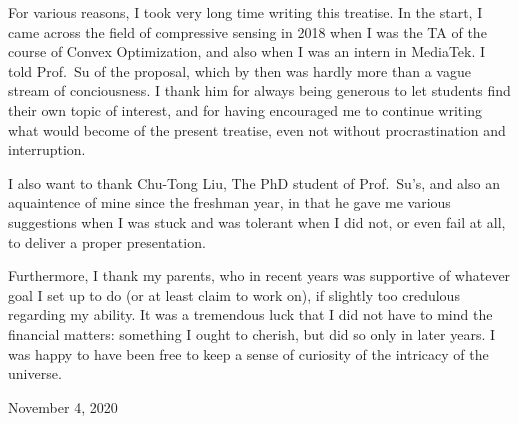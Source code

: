 \starttitle [title={Acknowledgement}]

For various reasons, I took very long time writing this treatise.
In the start, I came across the field of compressive sensing in 2018 when I was the TA of the course of Convex Optimization, and also when I was an intern in MediaTek.
I told Prof.\ Su of the proposal, which by then was hardly more than a vague stream of conciousness.
I thank him for always being generous to let students find their own topic of interest, and for having encouraged me to continue writing what would become of the present treatise, even not without procrastination and interruption.

I also want to thank Chu-Tong Liu, The PhD student of Prof.\ Su's, and also an aquaintence of mine since the freshman year, in that he gave me various suggestions when I was stuck and was tolerant when I did not, or even fail at all, to deliver a proper presentation.

Furthermore, I thank my parents, who in recent years was supportive of whatever goal I set up to do (or at least claim to work on), if slightly too credulous regarding my ability.
It was a tremendous luck that I did not have to mind the financial matters: something I ought to cherish, but did so only in later years.
I was happy to have been free to keep a sense of curiosity of the intricacy of the universe.

November 4, 2020

\stoptitle


